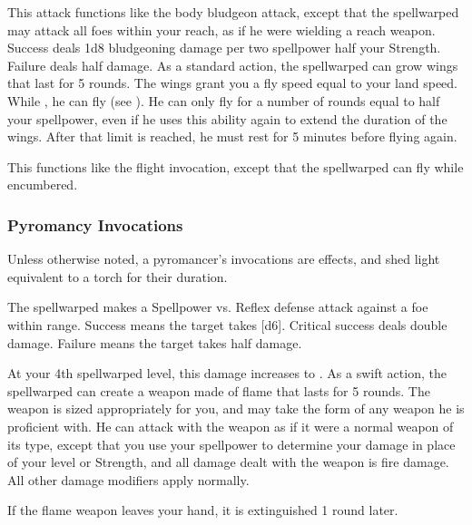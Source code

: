             This attack functions like the body bludgeon attack, except that the spellwarped may attack all foes within your reach, as if he were wielding a reach weapon.
            Success deals 1d8 bludgeoning damage per two spellpower \add half your Strength.
            Failure deals half damage.
            As a standard action, the spellwarped can grow wings that last for 5 rounds.
            The wings grant you a fly speed equal to your land speed.
            While \unencumbered, he can fly (see ).
            He can only fly for a number of rounds equal to half your spellpower, even if he uses this ability again to extend the duration of the wings.
            After that limit is reached, he must rest for 5 minutes before flying again.

            This functions like the flight invocation, except that the spellwarped can fly while encumbered.

        \subsubsection{Pyromancy Invocations}
            Unless otherwise noted, a pyromancer's invocations are  effects, and shed light equivalent to a torch for their duration.

            The spellwarped makes a Spellpower vs. Reflex defense attack against a foe within \rngmed range.
            Success means the target takes [d6].
            Critical success deals double damage.
            Failure means the target takes half damage.
            \par At your 4th spellwarped level, this damage increases to .
            As a swift action, the spellwarped can create a weapon made of flame that lasts for 5 rounds.
            The weapon is sized appropriately for you, and may take the form of any weapon he is proficient with.
            He can attack with the weapon as if it were a normal weapon of its type, except that you use your spellpower to determine your damage in place of your level or Strength, and all damage dealt with the weapon is fire damage.
            All other damage modifiers apply normally.
            \par If the flame weapon leaves your hand, it is extinguished 1 round later.

